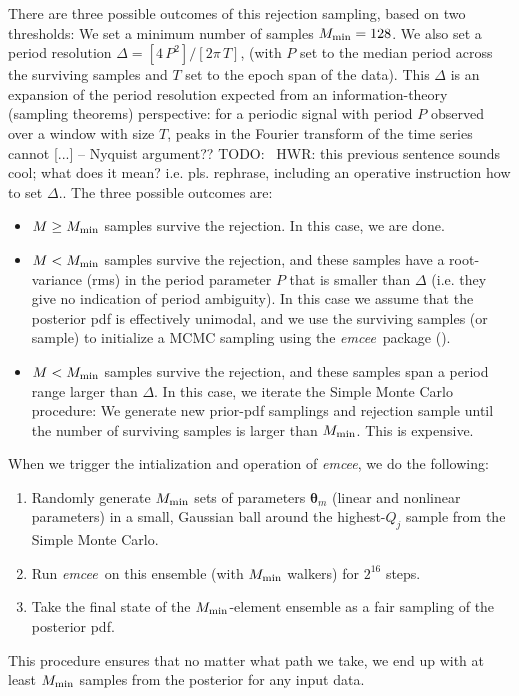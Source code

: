 \documentclass[manuscript, letterpaper]{aastex6}
\newcommand{\project}[1]{\textsl{#1}}
\newcommand{\emcee}{\project{emcee}}
\newcommand{\bs}[1]{\boldsymbol{#1}}
\newcommand{\todo}[1]{{\color{red}TODO: #1}}
\begin{document}
There are three possible outcomes of this rejection sampling, based on two
thresholds:
We set a minimum number of samples $M_{\rm min}=128$.
We also set a period resolution $\Delta = [4\,P^2] / [2\pi\,T]$, (with
$P$ set to the median period across the surviving samples and $T$ set to
the epoch span of the data).
This $\Delta$ is an expansion of the period resolution expected from an
information-theory (sampling theorems) perspective:
for a periodic signal with period $P$ observed over a window with size $T$,
peaks in the Fourier transform of the time series cannot [...] -- Nyquist argument??
\todo{~HWR: this previous sentence sounds cool; what does it mean? i.e. pls. rephrase,
including an operative instruction how to set $\Delta$.}.
The three possible outcomes are:
\begin{itemize}\itemsep0ex
\item $M\geq M_{\rm min}$ samples survive the rejection.
  In this case, we are done.
\item $M<M_{\rm min}$ samples survive the rejection, and these samples have a
  root-variance (rms) in the period parameter $P$ that is smaller than $\Delta$
  (i.e. they give no indication of period ambiguity).
  In this case we assume that the posterior pdf is effectively unimodal, and we
  use the surviving samples (or sample) to initialize a MCMC sampling using the
  \emcee\ package (\citealt{Foreman-Mackey:2013}).
\item $M<M_{\rm min}$ samples survive the rejection, and these samples
  span a period range larger than $\Delta$.
  In this case, we iterate the Simple Monte Carlo procedure: We generate new
  prior-pdf samplings and rejection sample until the number of surviving samples
  is larger than $M_{\rm min}$.
  This is expensive.
\end{itemize}
When we trigger the intialization and operation of \emcee, we do the following:
\begin{enumerate}\itemsep0ex
\item Randomly generate $M_{\rm min}$ sets of parameters $\bs{\theta}_m$
  (linear and nonlinear parameters) in a small, Gaussian ball around
  the highest-$Q_j$ sample from the Simple Monte Carlo.
\item Run \emcee\ on this ensemble (with $M_{\rm min}$ walkers) for $2^{16}$
  steps.
\item Take the final state of the $M_{\rm min}$-element ensemble as a
  fair sampling of the posterior pdf.
\end{enumerate}
This procedure ensures that no matter what path we take, we end up with
at least $M_{\rm min}$ samples from the posterior for any input data.
\end{document}

